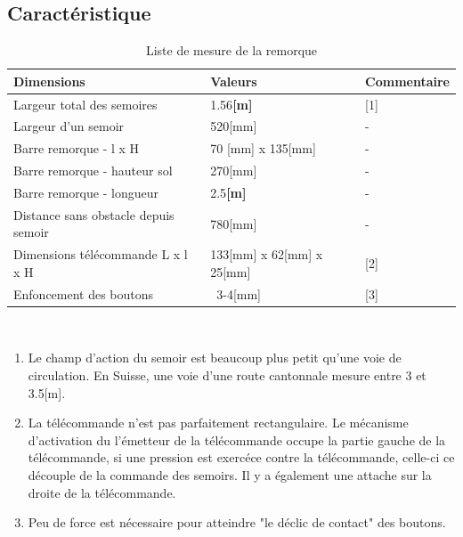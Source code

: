 \subsection{Caractéristique}
\begin{table}[H]
    \begin{center}
        \caption{Liste de mesure de la remorque}
        \begin{tabular}{|l|l|l|}
            Dimensions                           & Valeurs                   & Commentaire \\ \hline
            Largeur total des semoires           & 1.56\textbf{[m]}          & [1]         \\
            Largeur d'un semoir                  & 520[mm]                   & -           \\
            Barre remorque - l x H               & 70 [mm] x 135[mm]         & -           \\
            Barre remorque - hauteur sol         & 270[mm]                   & -           \\
            Barre remorque - longueur            & 2.5\textbf{[m]}           & -           \\
            Distance sans obstacle depuis semoir & 780[mm]                   & -           \\
            Dimensions télécommande L x l x H    & 133[mm] x 62[mm] x 25[mm] & [2]         \\
            Enfoncement des boutons              & ~3-4[mm]                  & [3]         \\
        \end{tabular}
    \end{center}
\end{table}\\
\begin{enumerate}
    \item{Le champ d'action du semoir est beaucoup plus petit qu'une voie de circulation. En Suisse, une voie d'une route cantonnale mesure entre 3 et 3.5[m].}
    \item{La télécommande n'est pas parfaitement rectangulaire. Le mécanisme d'activation du l'émetteur de la télécommande occupe la partie gauche de la télécommande,
                si une pression est exercéce contre la télécommande, celle-ci ce découple de la commande des semoirs. Il y a également une attache sur la droite de la télécommande.}
    \item{Peu de force est nécessaire pour atteindre "le déclic de contact" des boutons.}
\end{enumerate}

